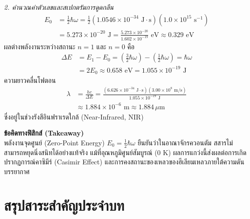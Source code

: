 \begin{psctexample}
\textit{2. คำนวณค่าตัวเลขและสเปกตรัมการดูดกลืน}
\begin{align}
E_0 &= \frac{1}{2} \hbar \omega = \frac{1}{2} (1.0546 \times 10^{-34}\text{ J}\cdot\text{s}) (1.0 \times 10^{15}\text{ s}^{-1}) \nonumber \\
&= 5.273 \times 10^{-20}\text{ J} = \frac{5.273 \times 10^{-20}}{1.602 \times 10^{-19}}\text{ eV} \approx 0.329\text{ eV}
\end{align}
ผลต่างพลังงานระหว่างสถานะ $n=1$ และ $n=0$ คือ
\begin{align}
\Delta E &= E_1 - E_0 = \left(\frac{3}{2}\hbar\omega\right) - \left(\frac{1}{2}\hbar\omega\right) = \hbar\omega \nonumber \\
&= 2 E_0 \approx 0.658\text{ eV} = 1.055 \times 10^{-19}\text{ J}
\end{align}
ความยาวคลื่นโฟตอน
\begin{align}
\lambda &= \frac{hc}{\Delta E} = \frac{(6.626 \times 10^{-34}\text{ J}\cdot\text{s}) (3.00 \times 10^8\text{ m/s})}{1.055 \times 10^{-19}\text{ J}} \nonumber \\
&\approx 1.884 \times 10^{-6}\text{ m} \approx 1.884\,\mu\text{m}
\end{align}
ซึ่งอยู่ในช่วงรังสีอินฟราเรดใกล้ (Near-Infrared, NIR)

\textbf{ข้อคิดทางฟิสิกส์ (Takeaway)} \\
พลังงานจุดศูนย์ (Zero-Point Energy) $E_0 = \frac{1}{2}\hbar\omega$ ยืนยันว่าในอาณาจักรควอนตัม สสารไม่สามารถหยุดนิ่งสนิทได้อย่างแท้จริง แม้ที่อุณหภูมิศูนย์สัมบูรณ์ ($0\text{ K}$) ผลการแกว่งนี้ส่งผลต่อการเกิดปรากฏการณ์คาซิมีร์ (Casimir Effect) และการคงสถานะของเหลวของฮีเลียมเหลวภายใต้ความดันบรรยากาศ
\qedexam
\end{psctexample}

\section{สรุปสาระสำคัญประจำบท}

